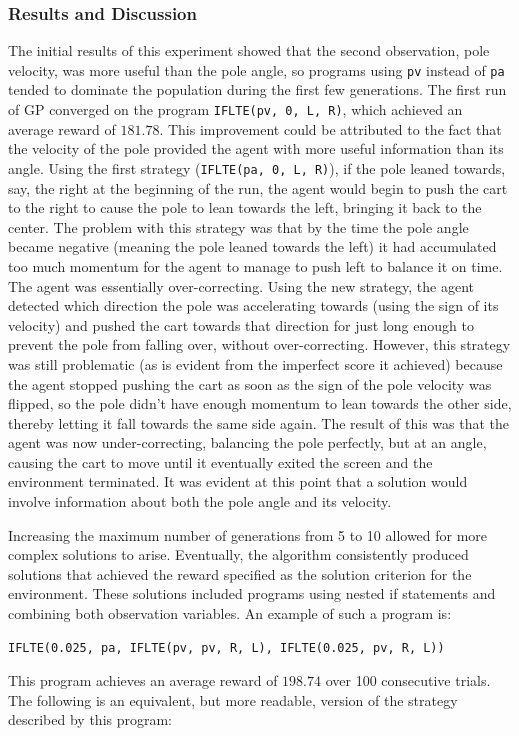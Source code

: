 \subsubsection{Results and Discussion}
The initial results of this experiment showed that the second observation, pole velocity, was more useful than the pole angle, so programs using \verb+pv+ instead of \verb+pa+ tended to dominate the population during the first few generations. The first run of GP converged on the program \verb+IFLTE(pv, 0, L, R)+, which achieved an average reward of $181.78$. This improvement could be attributed to the fact that the velocity of the pole provided the agent with more useful information than its angle. Using the first strategy (\verb+IFLTE(pa, 0, L, R)+), if the pole leaned towards, say, the right at the beginning of the run, the agent would begin to push the cart to the right to cause the pole to lean towards the left, bringing it back to the center. The problem with this strategy was that by the time the pole angle became negative (meaning the pole leaned towards the left) it had accumulated too much momentum for the agent to manage to push left to balance it on time. The agent was essentially over-correcting. Using the new strategy, the agent detected which direction the pole was accelerating towards (using the sign of its velocity) and pushed the cart towards that direction for just long enough to prevent the pole from falling over, without over-correcting. However, this strategy was still problematic (as is evident from the imperfect score it achieved) because the agent stopped pushing the cart as soon as the sign of the pole velocity was flipped, so the pole didn't have enough momentum to lean towards the other side, thereby letting it fall towards the same side again. The result of this was that the agent was now under-correcting, balancing the pole perfectly, but at an angle, causing the cart to move until it eventually exited the screen and the environment terminated. It was evident at this point that a solution would involve information about both the pole angle and its velocity.

Increasing the maximum number of generations from 5 to 10 allowed for more complex solutions to arise. Eventually, the algorithm consistently produced solutions that achieved the reward specified as the solution criterion for the environment. These solutions included programs using nested if statements and combining both observation variables. An example of such a program is:
\begin{verbatim}IFLTE(0.025, pa, IFLTE(pv, pv, R, L), IFLTE(0.025, pv, R, L))\end{verbatim}
This program achieves an average reward of $198.74$ over 100 consecutive trials. The following is an equivalent, but more readable, version of the strategy described by this program:

